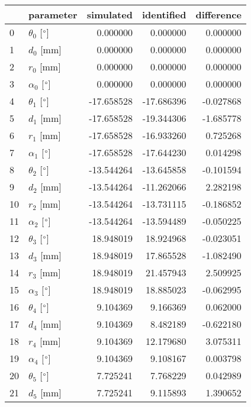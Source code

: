 \documentclass{standalone}%
\begin{document}
%
\normalsize%
\begin{tabular}{llrrr}
\toprule
{} &                 parameter &  simulated & identified & difference \\
\midrule
0  &  $\theta_{0}$ [$\degree$] &   0.000000 &   0.000000 &   0.000000 \\
1  &              $d_{0}$ [mm] &   0.000000 &   0.000000 &   0.000000 \\
2  &              $r_{0}$ [mm] &   0.000000 &   0.000000 &   0.000000 \\
3  &  $\alpha_{0}$ [$\degree$] &   0.000000 &   0.000000 &   0.000000 \\
4  &  $\theta_{1}$ [$\degree$] & -17.658528 & -17.686396 &  -0.027868 \\
5  &              $d_{1}$ [mm] & -17.658528 & -19.344306 &  -1.685778 \\
6  &              $r_{1}$ [mm] & -17.658528 & -16.933260 &   0.725268 \\
7  &  $\alpha_{1}$ [$\degree$] & -17.658528 & -17.644230 &   0.014298 \\
8  &  $\theta_{2}$ [$\degree$] & -13.544264 & -13.645858 &  -0.101594 \\
9  &              $d_{2}$ [mm] & -13.544264 & -11.262066 &   2.282198 \\
10 &              $r_{2}$ [mm] & -13.544264 & -13.731115 &  -0.186852 \\
11 &  $\alpha_{2}$ [$\degree$] & -13.544264 & -13.594489 &  -0.050225 \\
12 &  $\theta_{3}$ [$\degree$] &  18.948019 &  18.924968 &  -0.023051 \\
13 &              $d_{3}$ [mm] &  18.948019 &  17.865528 &  -1.082490 \\
14 &              $r_{3}$ [mm] &  18.948019 &  21.457943 &   2.509925 \\
15 &  $\alpha_{3}$ [$\degree$] &  18.948019 &  18.885023 &  -0.062995 \\
16 &  $\theta_{4}$ [$\degree$] &   9.104369 &   9.166369 &   0.062000 \\
17 &              $d_{4}$ [mm] &   9.104369 &   8.482189 &  -0.622180 \\
18 &              $r_{4}$ [mm] &   9.104369 &  12.179680 &   3.075311 \\
19 &  $\alpha_{4}$ [$\degree$] &   9.104369 &   9.108167 &   0.003798 \\
20 &  $\theta_{5}$ [$\degree$] &   7.725241 &   7.768229 &   0.042989 \\
21 &              $d_{5}$ [mm] &   7.725241 &   9.115893 &   1.390652 \\

\end{tabular}
\end{document}
